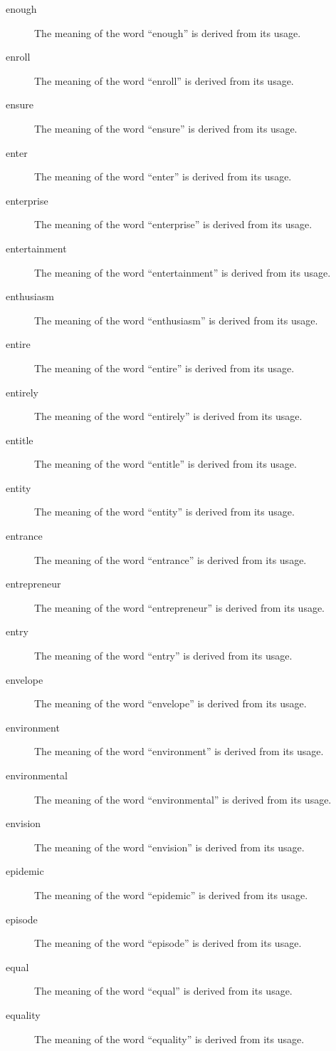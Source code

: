 \documentclass[12pt, letterpaper]{memoir}
\begin{document}
\begin{description}
\item[enough] The meaning of the word ``enough'' is derived from its usage.
\item[enroll] The meaning of the word ``enroll'' is derived from its usage.
\item[ensure] The meaning of the word ``ensure'' is derived from its usage.
\item[enter] The meaning of the word ``enter'' is derived from its usage.
\item[enterprise] The meaning of the word ``enterprise'' is derived from its usage.
\item[entertainment] The meaning of the word ``entertainment'' is derived from its usage.
\item[enthusiasm] The meaning of the word ``enthusiasm'' is derived from its usage.
\item[entire] The meaning of the word ``entire'' is derived from its usage.
\item[entirely] The meaning of the word ``entirely'' is derived from its usage.
\item[entitle] The meaning of the word ``entitle'' is derived from its usage.
\item[entity] The meaning of the word ``entity'' is derived from its usage.
\item[entrance] The meaning of the word ``entrance'' is derived from its usage.
\item[entrepreneur] The meaning of the word ``entrepreneur'' is derived from its usage.
\item[entry] The meaning of the word ``entry'' is derived from its usage.
\item[envelope] The meaning of the word ``envelope'' is derived from its usage.
\item[environment] The meaning of the word ``environment'' is derived from its usage.
\item[environmental] The meaning of the word ``environmental'' is derived from its usage.
\item[envision] The meaning of the word ``envision'' is derived from its usage.
\item[epidemic] The meaning of the word ``epidemic'' is derived from its usage.
\item[episode] The meaning of the word ``episode'' is derived from its usage.
\item[equal] The meaning of the word ``equal'' is derived from its usage.
\item[equality] The meaning of the word ``equality'' is derived from its usage.

\end{description}
\end{document}
